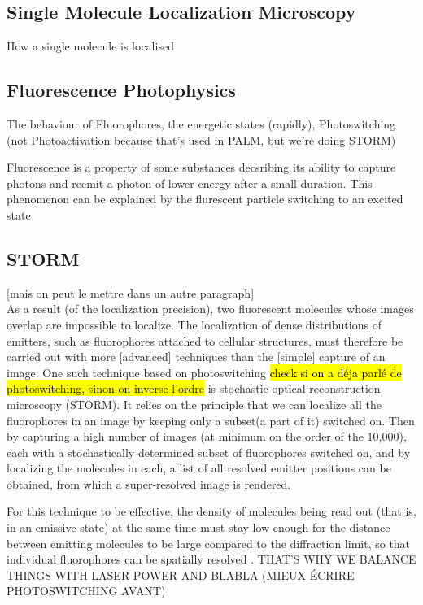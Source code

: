 \subsection{Single Molecule Localization Microscopy}
How a single molecule is localised 



\subsection{Fluorescence Photophysics}
The behaviour of Fluorophores, the energetic states (rapidly), Photoswitching (not Photoactivation because that's used in PALM, but we're doing STORM)

Fluorescence is a property of some substances decsribing its ability to capture photons and reemit a photon of lower energy after a small duration. This phenomenon can be explained by the flurescent particle switching to an excited state

\subsection{STORM} [mais on peut le mettre dans un autre paragraph] \\
As a result (of the localization precision), two fluorescent molecules whose images overlap are impossible to localize.
The localization of dense distributions of emitters, such as fluorophores attached to cellular structures, must therefore be carried out with more [advanced] techniques than the [simple] capture of an image.
One such technique based on photoswitching \hl{check si on a déja parlé de photoswitching, sinon on inverse l'ordre} is stochastic optical reconstruction microscopy (STORM).
It relies on the principle that we can localize all the fluorophores in an image by keeping only a subset(a part of it) switched on.
Then by capturing a high number of images (at minimum on the order of the 10,000), each with a stochastically determined subset of fluorophores switched on, and by localizing the molecules in each, a list of all resolved emitter positions can be obtained, from which a super-resolved image is rendered.

For this technique to be effective, the density of molecules being read out
(that is, in an emissive state) at the same time must stay low
enough for the distance between emitting molecules to be large
compared to the diﬀraction limit, so that individual fluorophores
can be spatially resolved \cite{furstenberg_single-molecule_2013}.
THAT'S WHY WE BALANCE THINGS WITH LASER POWER AND BLABLA (MIEUX ÉCRIRE PHOTOSWITCHING AVANT)

